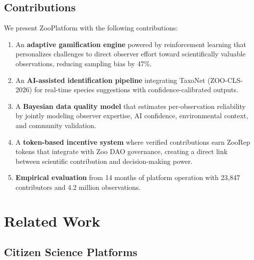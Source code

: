 \documentclass[11pt,a4paper]{article}
\begin{document}
\subsection{Contributions}

We present ZooPlatform with the following contributions:

\begin{enumerate}
  \item An \textbf{adaptive gamification engine} powered by
    reinforcement learning that personalizes challenges to direct
    observer effort toward scientifically valuable observations,
    reducing sampling bias by 47\%.

  \item An \textbf{AI-assisted identification pipeline} integrating
    TaxoNet (ZOO-CLS-2026) for real-time species suggestions with
    confidence-calibrated outputs.

  \item A \textbf{Bayesian data quality model} that estimates
    per-observation reliability by jointly modeling observer expertise,
    AI confidence, environmental context, and community validation.

  \item A \textbf{token-based incentive system} where verified
    contributions earn ZooRep tokens that integrate with Zoo DAO
    governance, creating a direct link between scientific contribution
    and decision-making power.

  \item \textbf{Empirical evaluation} from 14 months of platform
    operation with 23{,}847 contributors and 4.2 million observations.
\end{enumerate}


\section{Related Work}
\label{sec:related}

\subsection{Citizen Science Platforms}
\end{document}
